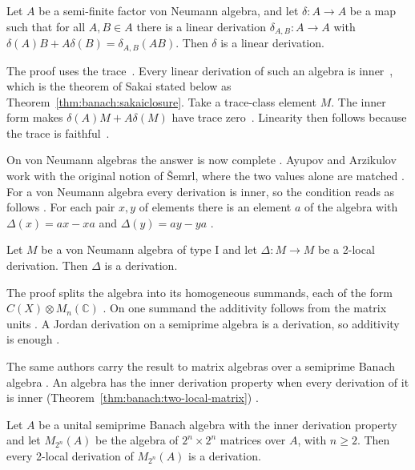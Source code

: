 \begin{theorem}\label{thm:banach:two-local}
Let $A$ be a semi-finite factor von Neumann algebra, and let
$\delta\colon A \to A$ be a map such that for all $A, B \in A$ there is a
linear derivation $\delta_{A,B}\colon A \to A$ with
$\delta(A)B + A\delta(B) = \delta_{A,B}(AB)$. Then $\delta$ is a linear
derivation.
\end{theorem}

The proof uses the trace~\cite[p.~910]{Liu2025TwoLocal}. Every linear
derivation of such an algebra is inner~\cite[p.~910]{Liu2025TwoLocal}, which
is the theorem of Sakai stated below as
Theorem~\ref{thm:banach:sakaiclosure}. Take a trace-class element $M$. The
inner form makes $\delta(A)M + A\delta(M)$ have trace
zero~\cite[p.~910]{Liu2025TwoLocal}. Linearity then follows because the trace
is faithful~\cite[p.~910]{Liu2025TwoLocal}.

On von Neumann algebras the answer is now complete
\cite[p.~1]{AyupovArzikulov2011TwoLocal}. Ayupov and Arzikulov work with the
original notion of \v{S}emrl, where the two values alone are matched
\cite[p.~1]{AyupovArzikulov2011TwoLocal}. For a von Neumann algebra every
derivation is inner, so the condition reads as follows
\cite[p.~2]{AyupovArzikulov2011TwoLocal}. For each pair $x,y$ of elements
there is an element $a$ of the algebra with $\Delta(x)=ax-xa$ and
$\Delta(y)=ay-ya$ \cite[p.~2]{AyupovArzikulov2011TwoLocal}.

\begin{theorem}\label{thm:banach:two-local-typeI}
Let $M$ be a von Neumann algebra of type I and let $\Delta\colon M\to M$ be
a 2-local derivation. Then $\Delta$ is a derivation.
\end{theorem}

The proof splits the algebra into its homogeneous summands, each of the form
$C(X)\otimes M_n(\mathbb{C})$ \cite[p.~7]{AyupovArzikulov2011TwoLocal}. On
one summand the additivity follows from the matrix units
\cite[Theorem~1, p.~3]{AyupovArzikulov2011TwoLocal}. A Jordan derivation on
a semiprime algebra is a derivation, so additivity is enough
\cite[p.~3]{AyupovArzikulov2011TwoLocal}.

The same authors carry the result to matrix algebras over a semiprime Banach
algebra \cite[p.~1]{AyupovKudaybergenov2014Matrix}. An algebra has the
inner derivation property when every derivation of it is inner (Theorem~\ref{thm:banach:two-local-matrix})
\cite[p.~2]{AyupovKudaybergenov2014Matrix}.\begin{theorem}\label{thm:banach:two-local-matrix}
Let $A$ be a unital semiprime Banach algebra with the inner derivation
property and let $M_{2^n}(A)$ be the algebra of $2^n\times 2^n$ matrices
over $A$, with $n\geq 2$. Then every 2-local derivation of $M_{2^n}(A)$ is
a derivation.
\end{theorem}

